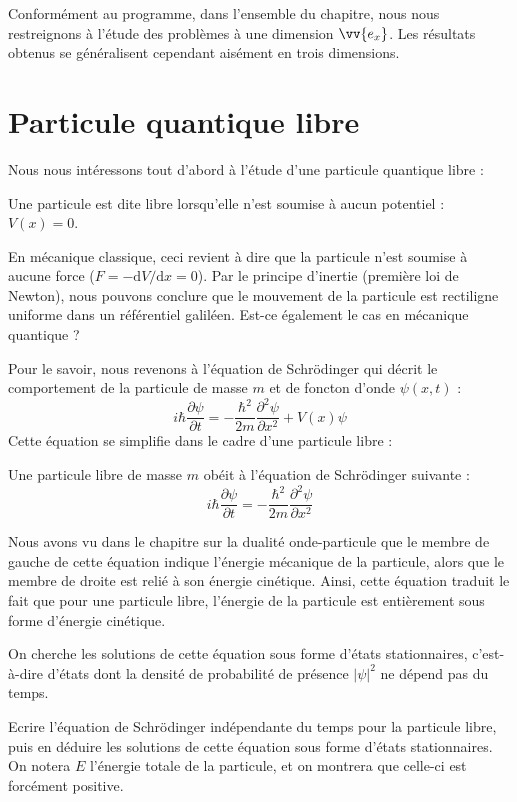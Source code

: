 \documentclass[11pt,fleqn]{book} %
\newcommand{\dd}{\mathrm{d}}
\begin{document}
Conformément au programme, dans l'ensemble du chapitre, nous nous restreignons à l'étude des problèmes à une dimension $\vv{e_x}$. Les résultats obtenus se généralisent cependant aisément en trois dimensions.

\section{Particule quantique libre}

Nous nous intéressons tout d'abord à l'étude d'une particule quantique libre :
\begin{definition}
	Une particule est dite libre lorsqu'elle n'est soumise à aucun potentiel : $V(x) = 0$.
\end{definition}

En mécanique classique, ceci revient à dire que la particule n'est soumise à aucune force ($F = - \dd V/\dd x = 0$). Par le principe d'inertie (première loi de Newton), nous pouvons conclure que le mouvement de la particule est rectiligne uniforme dans un référentiel galiléen. Est-ce également le cas en mécanique quantique ?

Pour le savoir, nous revenons à l'équation de Schrödinger qui décrit le comportement de la particule de masse $m$ et de foncton d'onde $\psi(x,t)$ :
\begin{equation}
	i \hbar \frac{\partial \psi}{\partial t} = - \frac{\hbar^2}{2 m} \frac{\partial^2 \psi}{\partial x^2} + V(x) \psi
\end{equation}
Cette équation se simplifie dans le cadre d'une particule libre :
\begin{proposition}
	Une particule libre de masse $m$ obéit à l'équation de Schrödinger suivante :
	\begin{equation}
	i \hbar \frac{\partial \psi}{\partial t} = - \frac{\hbar^2}{2 m} \frac{\partial^2 \psi}{\partial x^2}
	\end{equation}
\end{proposition}
Nous avons vu dans le chapitre sur la dualité onde-particule que le membre de gauche de cette équation indique l'énergie mécanique de la particule, alors que le membre de droite est relié à son énergie cinétique. Ainsi, cette équation traduit le fait que pour une particule libre, l'énergie de la particule est entièrement sous forme d'énergie cinétique.

On cherche les solutions de cette équation sous forme d'états stationnaires, c'est-à-dire d'états dont la densité de probabilité de présence $|\psi|^2$ ne dépend pas du temps.
\begin{capex}
	Ecrire l'équation de Schrödinger indépendante du temps pour la particule libre, puis en déduire les solutions de cette équation sous forme d'états stationnaires. On notera $E$ l'énergie totale de la particule, et on montrera que celle-ci est forcément positive. 
\end{capex}
\end{document}
